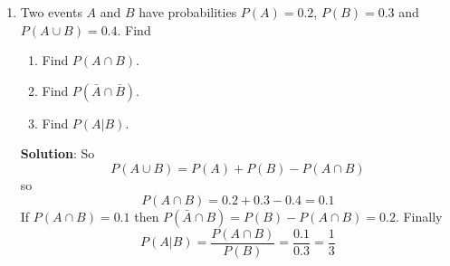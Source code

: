 \documentclass[11pt,a4paper]{scrartcl}
\begin{document}
\begin{enumerate}
\item Two events $A$ and $B$ have probabilities $P(A)=0.2$, $P(B)=0.3$ and $P(A\cup B)=0.4$. Find
\begin{enumerate}
\item Find $P(A\cap B)$.
\item Find $P(\bar{A}\cap \bar{B})$.
\item Find $P(A|B)$.
\end{enumerate}
\textbf{Solution}: So
\begin{equation}
P(A\cup B)=P(A)+P(B)-P(A\cap B)
\end{equation}
so 
\begin{equation}
P(A\cap B)=0.2+0.3-0.4=0.1
\end{equation}
If $P(A\cap B)=0.1$ then $P(\bar{A}\cap B)=P(B)-P(A\cap B)=0.2$. Finally
\begin{equation}
P(A|B)=\frac{P(A\cap B)}{P(B)}=\frac{0.1}{0.3}=\frac{1}{3}
\end{equation}
\end{enumerate}
\end{document}
